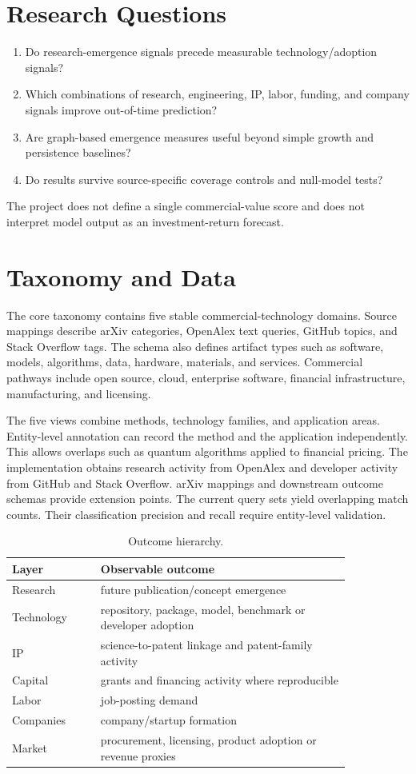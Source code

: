 \documentclass[11pt]{article}
\begin{document}
\section{Research Questions}
\begin{enumerate}
\item Do research-emergence signals precede measurable technology/adoption signals?
\item Which combinations of research, engineering, IP, labor, funding, and company signals improve out-of-time prediction?
\item Are graph-based emergence measures useful beyond simple growth and persistence baselines?
\item Do results survive source-specific coverage controls and null-model tests?
\end{enumerate}
The project does not define a single commercial-value score and does not interpret model output as an investment-return forecast.
\section{Taxonomy and Data}
The core taxonomy contains five stable commercial-technology domains. Source mappings describe arXiv categories, OpenAlex text queries, GitHub topics, and Stack Overflow tags. The schema also defines artifact types such as software, models, algorithms, data, hardware, materials, and services. Commercial pathways include open source, cloud, enterprise software, financial infrastructure, manufacturing, and licensing.

The five views combine methods, technology families, and application areas. Entity-level annotation can record the method and the application independently. This allows overlaps such as quantum algorithms applied to financial pricing. The implementation obtains research activity from OpenAlex and developer activity from GitHub and Stack Overflow. arXiv mappings and downstream outcome schemas provide extension points. The current query sets yield overlapping match counts. Their classification precision and recall require entity-level validation.
\begin{table}[h]
\centering
\caption{Outcome hierarchy.}
\begin{tabular}{p{0.22\linewidth}p{0.62\linewidth}}
\toprule
Layer & Observable outcome \\
\midrule
Research & future publication/concept emergence \\
Technology & repository, package, model, benchmark or developer adoption \\
IP & science-to-patent linkage and patent-family activity \\
Capital & grants and financing activity where reproducible \\
Labor & job-posting demand \\
Companies & company/startup formation \\
Market & procurement, licensing, product adoption or revenue proxies \\
\bottomrule
\end{tabular}
\end{table}
\end{document}
